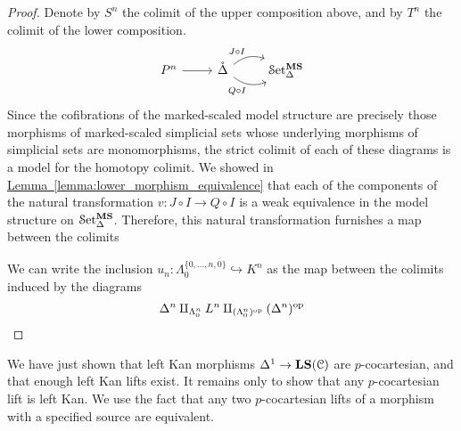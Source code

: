 \documentclass[main.tex]{subfiles}
\begin{document}
\begin{proof}
  Denote by $S^{n}$ the colimit of the upper composition above, and by $T^{n}$ the colimit of the lower composition.
  \begin{equation*}
    \begin{tikzcd}
      P^{n}
      \arrow[r]
      & \mathring{\Delta}
      \arrow[r, bend left, "J \circ I"]
      \arrow[r, bend right, swap, "Q \circ I"]
      & \SSetms
    \end{tikzcd}
  \end{equation*}
  Since the cofibrations of the marked-scaled model structure are precisely those morphisms of marked-scaled simplicial sets whose underlying morphisms of simplicial sets are monomorphisms, the strict colimit of each of these diagrams is a model for the homotopy colimit. We showed in \hyperref[lemma:lower_morphism_equivalence]{Lemma~\ref*{lemma:lower_morphism_equivalence}} that each of the components of the natural transformation $v\colon J \circ I \to Q \circ I$ is a weak equivalence in the model structure on $\mathcal{S}\mathrm{et}_{\Delta}^{\mathbf{MS}}$. Therefore, this natural transformation furnishes a map between the colimits  

  We can write the inclusion $u_{n}\colon \Lambda^{\{0, \ldots, n, \overline{0}\}}_{0} \hookrightarrow K^{n}$ as the map between the colimits induced by the diagrams
  \begin{equation*}
    \Delta^{n} \amalg_{\Lambda^{n}_{0}} L^{n} \amalg_{(\Lambda^{n}_{0})^{\mathrm{op}}} (\Delta^{n})^{\mathrm{op}}
  \end{equation*}
\end{proof}



We have just shown that left Kan morphisms $\Delta^{1} \to \mathbf{LS}(\mathcal{C})$ are $p$-cocartesian, and that enough left Kan lifts exist. It remains only to show that any $p$-cocartesian lift is left Kan. We use the fact that any two $p$-cocartesian lifts of a morphism with a specified source are equivalent.
\end{document}
